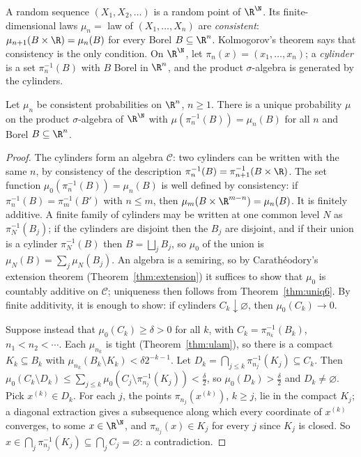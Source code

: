 A random sequence $(X_1,X_2,\ldots)$ is a random point of $\R^\N$. Its finite-dimensional laws $\mu_n=$ law of $(X_1,\dots,X_n)$ are \emph{consistent}: $\mu_{n+1}(B\times\R)=\mu_n(B)$ for every Borel $B\subseteq\R^n$. Kolmogorov's
theorem says that consistency is the only condition. On $\R^\N$, let $\pi_n(x)=(x_1,\dots,x_n)$; a \emph{cylinder} is a set $\pi_n^{-1}(B)$ with $B$ Borel in $\R^n$, and the product $\sigma$-algebra is generated by the cylinders.

\begin{theorem}[Kolmogorov, 1933]\label{thm:kolmogorov}
Let $\mu_n$ be consistent probabilities on $\R^n$, $n\ge1$. There is a unique probability $\mu$ on the product $\sigma$-algebra of $\R^\N$ with $\mu(\pi_n^{-1}(B))=\mu_n(B)$ for all $n$ and Borel $B\subseteq\R^n$.
\end{theorem}
\begin{proof}
The cylinders form an algebra $\mathcal C$: two cylinders can be written with the same $n$, by consistency of the description $\pi_n^{-1}(B)=\pi_{n+1}^{-1}(B\times\R)$. The set function $\mu_0(\pi_n^{-1}(B))=\mu_n(B)$ is well defined by consistency: if $\pi_n^{-1}(B)=\pi_m^{-1}(B')$ with $n\le m$, then $\mu_m(B\times\R^{m-n})=\mu_n(B)$. It is finitely additive. A finite family of cylinders may be written at one common level $N$ as $\pi_N^{-1}(B_j)$; if the cylinders are disjoint then the $B_j$ are disjoint, and if their union is a cylinder $\pi_N^{-1}(B)$ then $B=\bigsqcup_j B_j$, so $\mu_0$ of the union is $\mu_N(B)=\sum_j\mu_N(B_j)$. An algebra is a semiring, so by Carath\'eodory's extension theorem (Theorem~\ref{thm:extension}) it suffices to show that $\mu_0$ is countably additive on $\mathcal C$; uniqueness then follows from Theorem~\ref{thm:uniq6}.
By finite additivity, it is enough to show: if cylinders $C_k\downarrow\varnothing$, then $\mu_0(C_k)\to0$.

Suppose instead that $\mu_0(C_k)\ge\delta>0$ for all $k$, with $C_k=\pi_{n_k}^{-1}(B_k)$, $n_1<n_2<\cdots$. Each $\mu_{n_k}$ is tight (Theorem~\ref{thm:ulam}), so there is a compact $K_k\subseteq B_k$ with
$\mu_{n_k}(B_k\setminus K_k)<\delta2^{-k-1}$. Let $D_k=\bigcap_{j\le k}\pi_{n_j}^{-1}(K_j)\subseteq C_k$. Then $\mu_0(C_k\setminus D_k)\le\sum_{j\le k}\mu_0(C_j\setminus\pi_{n_j}^{-1}(K_j))<\frac\delta2$, so $\mu_0(D_k)>\frac\delta2$ and $D_k\ne\varnothing$.
Pick $x^{(k)}\in D_k$. For each $j$, the points $\pi_{n_j}(x^{(k)})$, $k\ge j$, lie in the compact $K_j$; a diagonal extraction gives a subsequence along which every coordinate of $x^{(k)}$ converges, to some $x\in\R^\N$, and
$\pi_{n_j}(x)\in K_j$ for every $j$ since $K_j$ is closed. So $x\in\bigcap_j\pi_{n_j}^{-1}(K_j)\subseteq\bigcap_jC_j=\varnothing$: a contradiction.
\end{proof}

